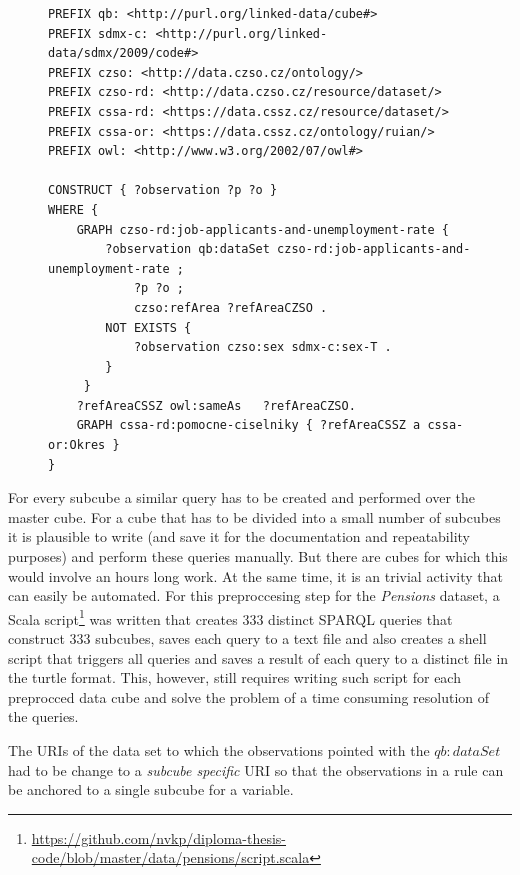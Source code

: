 \begin{figure}[h]
\begin{lstlisting}[language = SPARQL, caption={SPARQL query to create a subcube (Source: author)}, label={sparqlcutexample},captionpos=b escapeinside={(*@}{@*)}]
PREFIX qb: <http://purl.org/linked-data/cube#>
PREFIX sdmx-c: <http://purl.org/linked-data/sdmx/2009/code#>
PREFIX czso: <http://data.czso.cz/ontology/>
PREFIX czso-rd: <http://data.czso.cz/resource/dataset/>
PREFIX cssa-rd: <https://data.cssz.cz/resource/dataset/>
PREFIX cssa-or: <https://data.cssz.cz/ontology/ruian/>
PREFIX owl: <http://www.w3.org/2002/07/owl#>
    
CONSTRUCT { ?observation ?p ?o } 
WHERE { 
    GRAPH czso-rd:job-applicants-and-unemployment-rate {
        ?observation qb:dataSet czso-rd:job-applicants-and-unemployment-rate ;
            ?p ?o ;
            czso:refArea ?refAreaCZSO .
        NOT EXISTS {
            ?observation czso:sex sdmx-c:sex-T .
        }             
     }
    ?refAreaCSSZ owl:sameAs   ?refAreaCZSO.
    GRAPH cssa-rd:pomocne-ciselniky { ?refAreaCSSZ a cssa-or:Okres }
}
\end{lstlisting}
\end{figure}

For every subcube a similar query has to be created and performed over the master cube. For a cube that has to be divided into a small number of subcubes it is plausible to write (and save it for the documentation and repeatability purposes) and perform these queries manually. But there are cubes for which this would involve an hours long work. At the same time, it is an trivial activity that can easily be automated. For this preproccesing step for the \textit{Pensions} dataset, a Scala script\footnote{\href{https://github.com/nvkp/diploma-thesis-code/blob/master/data/pensions/script.scala}{https://github.com/nvkp/diploma-thesis-code/blob/master/data/pensions/script.scala}} was written that creates 333 distinct SPARQL queries that construct 333 subcubes, saves each query to a text file and also creates a shell script that triggers all queries and saves a result of each query to a distinct file in the turtle format. This, however, still requires writing such script for each preprocced data cube and solve the problem of a time consuming resolution of the queries.

The URIs of the data set to which the observations pointed with the $qb:dataSet$ had to be change to a \textit{subcube specific} URI so that the observations in a rule can be anchored to a single subcube for a variable.


